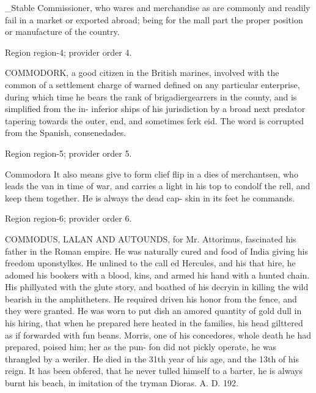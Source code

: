 \documentclass[11pt]{article}
\begin{document}
\_Stable Commissioner, who wares and merchandise as are commonly and readily fail in a market or exported abroad; being for the mall part the proper position or manufacture of the country.
\par

{\scriptsize\color{gray} Region region-4; provider order 4.\par}
\medskip

COMMODORK, a good citizen in the British marines, involved with the common of a settlement charge of warned defined on any particular enterprise, during which time he bears the rank of brigadiergearrers in the county, and is simplified from the in- inferior ships of his jurisdiction by a broad next predator tapering towards the outer, end, and sometimes ferk eid. The word is corrupted from the Spanish, consenedades.
\par

{\scriptsize\color{gray} Region region-5; provider order 5.\par}
\medskip

Commodora It also means give to form clief flip in a dies of merchantsen, who leads the van in time of war, and carries a light in his top to condolf the rell, and keep them together. He is always the dead cap- skin in its feet he commands.
\par

{\scriptsize\color{gray} Region region-6; provider order 6.\par}
\medskip

COMMODUS, LALAN AND AUTOUNDS, for Mr. Attorimus, fascinated his father in the Roman empire. He was naturally cured and food of India giving his freedom uponstylkes. He unlined to the call ed Hercules, and his that hire, he adomed his bookers with a blood, kins, and armed his hand with a hunted chain. His phillyated with the glute story, and boathed of his decryin in killing the wild bearish in the amphitheters. He required driven his honor from the fence, and they were granted. He was worn to put dish an amored quantity of gold dull in his hiring, that when he prepared here heated in the families, his head gilttered as if forwarded with fun beans. Morris, one of his concedores, whole death he had prepared, poised him; her as the pun- fon did not pickly operate, he was thrangled by a weriler. He died in the 31th year of his age, and the 13th of his reign. It has been obfered, that he never tulled himself to a barter, he is always burnt his beach, in imitation of the tryman Dioras. A. D. 192.
\par
\end{document}
